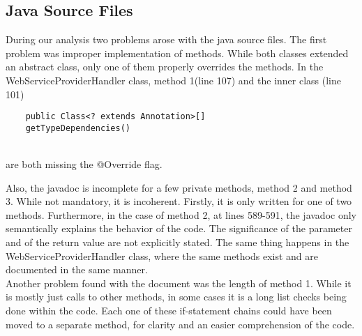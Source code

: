 \subsection{Java Source Files}

During our analysis two problems arose with the java source files. The first problem was improper implementation of methods. While both classes extended an abstract class, only one of them
properly overrides the methods. In the WebServiceProviderHandler class, method 1(line 107) and the inner class (line 101)
\begin{lstlisting}
	public Class<? extends Annotation>[] 
	getTypeDependencies()
\end{lstlisting}
\hfill \\
are both missing the @Override flag.

Also, the javadoc is incomplete for a few private methods, method 2 and method 3. While not mandatory, it is incoherent. Firstly, it is only written for one of two methods.
Furthermore, in the case of method 2, at lines 589-591, the javadoc only semantically explains the behavior of the code. The significance of the parameter and of the return value are not
explicitly stated. The same thing happens in the WebServiceProviderHandler class, where the same methods exist and are documented in the same manner.
\\
Another problem found with the document was the length of method 1. While it is mostly just calls to other methods, in some cases it is a long list checks being done within the code. Each
one of these if-statement chains could have been moved to a separate method, for clarity and an easier comprehension of the code.